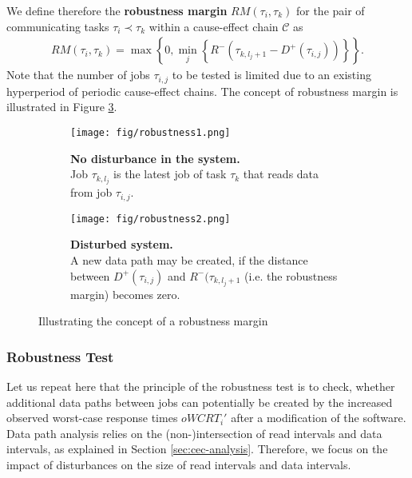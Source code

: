 We define therefore the \textbf{robustness margin} $RM(\tau_i, \tau_k)$ for the pair of communicating tasks $\tau_i \prec \tau_k$ within a cause-effect chain $\mathcal{C}$ as
\begin{align}
	RM(\tau_i, \tau_k) = 
	\max \left\{0, 
					\min \limits_j \left\{ R^-(\tau_{k,l_j+1} - D^+(\tau_{i,j})) \right\} 
	\right\}.
\end{align}
Note that the number of jobs $\tau_{i,j}$ to be tested is limited due to an existing hyperperiod of periodic cause-effect chains.
The concept of robustness margin is illustrated in Figure \ref{fig:r-margin}.
\smallskip



\begin{figure}[p]
    \centering
    \begin{subfigure}[b]{0.9\textwidth}
        \texttt{[image: fig/robustness1.png]}
        \caption{\textbf{No disturbance in the system.} \\Job $\tau_{k,l_j}$ is the latest job of task $\tau_k$ that reads data from job $\tau_{i,j}$.}
        \label{fig:robustness1}
    \end{subfigure}
    
		\vspace*{2cm} 

    \begin{subfigure}[b]{0.9\textwidth}
        \texttt{[image: fig/robustness2.png]}
        \caption{\textbf{Disturbed system.} \\A new data path may be created, if the distance between $D^+(\tau_{i,j})$ and $R^-(\tau_{k,l_j+1}$ (i.e. the robustness margin) becomes zero.}
        \label{fig:robustness2}
    \end{subfigure}

		\vspace*{1cm} 

    \caption{Illustrating the concept of a robustness margin}\label{fig:r-margin}
\end{figure}


\subsubsection{Robustness Test}
Let us repeat here that the principle of the robustness test is to check, whether additional data paths between jobs can potentially be created by the increased observed worst-case response times $oWCRT_i'$ after a modification of the software. 
Data path analysis relies on the (non-)intersection of read intervals and data intervals, as explained in Section \ref{sec:cec-analysis}. 
Therefore, we focus on the impact of disturbances on the size of read intervals and data intervals.
\bigskip

